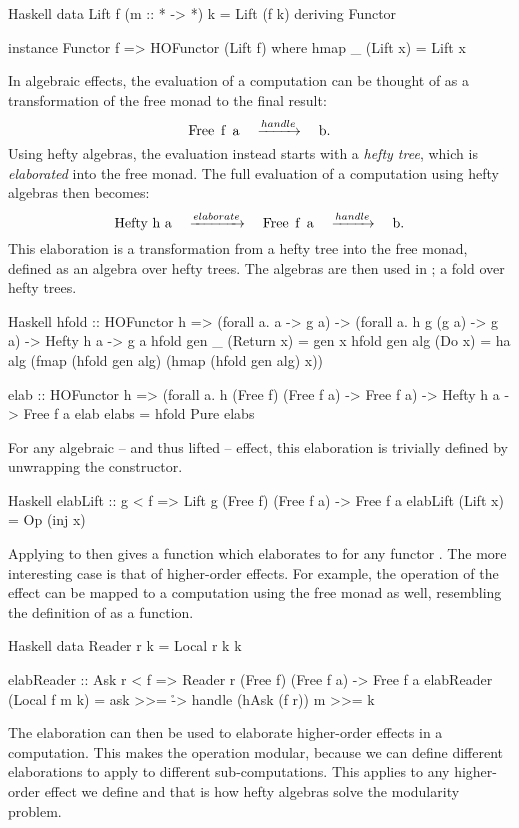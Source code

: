 \begin{lst}{Haskell}
data Lift f (m :: * -> *) k = Lift (f k)
  deriving Functor

instance Functor f => HOFunctor (Lift f) where
  hmap _ (Lift x) = Lift x
\end{lst}
%
In algebraic effects, the evaluation of a computation can be thought of as a transformation of the free monad to the final result: 
\[
    \mcode{Free f a} \quad\xrightarrow{handle}\quad \mcode{b}.
\]
Using hefty algebras, the evaluation instead starts with a \emph{hefty tree}, which is \emph{elaborated} into the free monad. The full evaluation of a computation using hefty algebras then becomes:
\[
    \mcode{Hefty h a} \quad\xrightarrow{elaborate}\quad \mcode{Free f a} \quad\xrightarrow{handle}\quad \mcode{b}.
\]
This elaboration is a transformation from a hefty tree into the free monad, defined as an algebra over hefty trees. The algebras are then used in ; a fold over hefty trees.

\begin{lst}{Haskell}
hfold :: HOFunctor h
      => (forall a. a -> g a)
      -> (forall a. h g (g a) -> g a)
      -> Hefty h a 
      -> g a
hfold gen _   (Return x) = gen x
hfold gen alg (Do x)     =
  ha alg (fmap (hfold gen alg) (hmap (hfold gen alg) x))

elab :: HOFunctor h
     => (forall a. h (Free f) (Free f a) -> Free f a)
     -> Hefty h a
     -> Free f a
elab elabs = hfold Pure elabs
\end{lst}
%
For any algebraic -- and thus lifted -- effect, this elaboration is trivially defined by unwrapping the  constructor.

\begin{lst}{Haskell}
elabLift :: g < f => Lift g (Free f) (Free f a) -> Free f a
elabLift (Lift x) = Op (inj x)
\end{lst}
%
Applying  to  then gives a function which elaborates  to  for any functor . The more interesting case is that of higher-order effects. For example, the  operation of the  effect can be mapped to a computation using the free monad as well, resembling the definition of  as a function.

\begin{lst}{Haskell}
data Reader r k = Local r k k

elabReader :: Ask r < f
           => Reader r (Free f) (Free f a)
           -> Free f a
elabReader (Local f m k) = ask >>= \r -> handle (hAsk (f r)) m >>= k
\end{lst}
%
The  elaboration can then be used to elaborate higher-order effects in a computation. This makes the  operation modular, because we can define different elaborations to apply to different sub-computations. This applies to any higher-order effect we define and that is how hefty algebras solve the modularity problem.

